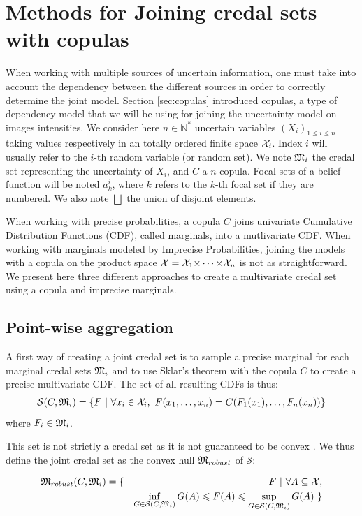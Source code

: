 \section{Methods for Joining credal sets with copulas}
When working with multiple sources of uncertain information, one must take into account the dependency between the different sources in order to correctly determine the joint model. Section \ref{sec:copulas} introduced copulas, a type of dependency model that we will be using for joining the uncertainty model on images intensities. We consider here $n\in\mathbb{N}^*$ uncertain variables $(X_i)_{1\leqslant i\leqslant n}$ taking values respectively in an totally ordered finite space ${\mathcal{X}}_i$. Index $i$ will usually refer to the $i$-th random variable (or random set). We note ${\mathfrak{M}}_i$ the credal set representing the uncertainty of $X_i$, and $C$ a $n$-copula. Focal sets of a belief function will be noted $a^i_k$, where $k$ refers to the $k$-th focal set if they are numbered. We also note $\bigsqcup$ the union of disjoint elements.

When working with precise probabilities, a copula $C$ joins univariate Cumulative Distribution Functions (CDF), called marginals, into a mutlivariate CDF. When working with marginals modeled by Imprecise Probabilities, joining the models with a copula on the product space ${\mathcal{X}}={\mathcal{X}}_1{\times\dots\times}{\mathcal{X}}_n$ is not as straightforward. We present here three different approaches to create a multivariate credal set using a copula and imprecise marginals. 

\subsection{Point-wise aggregation}
A first way of creating a joint credal set is to sample a precise marginal for each marginal credal sets ${\mathfrak{M}}_i$ and to use Sklar's theorem with the copula $C$ to create a precise multivariate CDF. The set of all resulting CDFs is thus:
\begin{eqnarray}\label{eq:robust_ancestor}
    \mathcal{S}(C,{\mathfrak{M}}_i) = \{F~|~\forall x_i \in {\mathcal{X}}_i,~ F(x_1,\dots,x_n) = C(F_1(x_1), \dots, F_n(x_n))\}
\end{eqnarray} where $F_i\in{\mathfrak{M}}_i$.

This set is not strictly a credal set as it is not guaranteed to be convex \cite{schmelzer_random_2023}. We thus define the joint credal set as the convex hull ${\mathfrak{M}}_{robust}$ of $\mathcal{S}$:

\begin{eqnarray}\label{eq:robust_set}
    {\mathfrak{M}}_{robust}(C,{\mathfrak{M}}_i) = \{&&F~|~\forall A \subseteq {\mathcal{X}},\nonumber\\
    &&\inf_{G\in\mathcal{S}(C,{\mathfrak{M}}_i)}G(A)\leqslant F(A)\leqslant\sup_{G\in\mathcal{S}(C,{\mathfrak{M}}_i)}G(A)~\}
\end{eqnarray}

